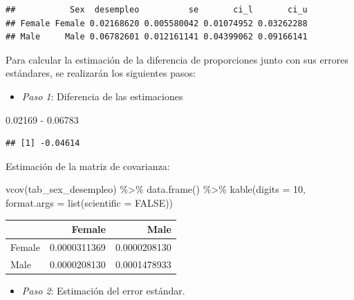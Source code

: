 \documentclass[
  12pt,
]{book}
\newenvironment{Shaded}{\begin{snugshade}}{\end{snugshade}}
\newcommand{\AttributeTok}[1]{\textcolor[rgb]{0.77,0.63,0.00}{#1}}
\newcommand{\ConstantTok}[1]{\textcolor[rgb]{0.00,0.00,0.00}{#1}}
\newcommand{\DecValTok}[1]{\textcolor[rgb]{0.00,0.00,0.81}{#1}}
\newcommand{\FloatTok}[1]{\textcolor[rgb]{0.00,0.00,0.81}{#1}}
\newcommand{\FunctionTok}[1]{\textcolor[rgb]{0.00,0.00,0.00}{#1}}
\newcommand{\NormalTok}[1]{#1}
\newcommand{\SpecialCharTok}[1]{\textcolor[rgb]{0.00,0.00,0.00}{#1}}
\providecommand{\tightlist}{%
  \setlength{\itemsep}{0pt}\setlength{\parskip}{0pt}}
\begin{document}
\begin{verbatim}
##           Sex  desempleo          se       ci_l       ci_u
## Female Female 0.02168620 0.005580042 0.01074952 0.03262288
## Male     Male 0.06782601 0.012161141 0.04399062 0.09166141
\end{verbatim}

Para calcular la estimación de la diferencia de proporciones junto con sus errores estándares, se realizarán los siguientes pasos:

\begin{itemize}
\tightlist
\item
  \emph{Paso 1}: Diferencia de las estimaciones
\end{itemize}

\begin{Shaded}
\begin{Highlighting}[]
\FloatTok{0.02169} \SpecialCharTok{{-}} \FloatTok{0.06783}   
\end{Highlighting}
\end{Shaded}

\begin{verbatim}
## [1] -0.04614
\end{verbatim}

Estimación de la matriz de covarianza:

\begin{Shaded}
\begin{Highlighting}[]
\FunctionTok{vcov}\NormalTok{(tab\_sex\_desempleo) }\SpecialCharTok{\%\textgreater{}\%} \FunctionTok{data.frame}\NormalTok{() }\SpecialCharTok{\%\textgreater{}\%} 
  \FunctionTok{kable}\NormalTok{(}\AttributeTok{digits =} \DecValTok{10}\NormalTok{,}
        \AttributeTok{format.args =} \FunctionTok{list}\NormalTok{(}\AttributeTok{scientific =} \ConstantTok{FALSE}\NormalTok{))}
\end{Highlighting}
\end{Shaded}

\begin{tabular}{l|r|r}
\hline
  & Female & Male\\
\hline
Female & 0.0000311369 & 0.0000208130\\
\hline
Male & 0.0000208130 & 0.0001478933\\
\hline
\end{tabular}

\begin{itemize}
\tightlist
\item
  \emph{Paso 2}: Estimación del error estándar.
\end{itemize}
\end{document}
